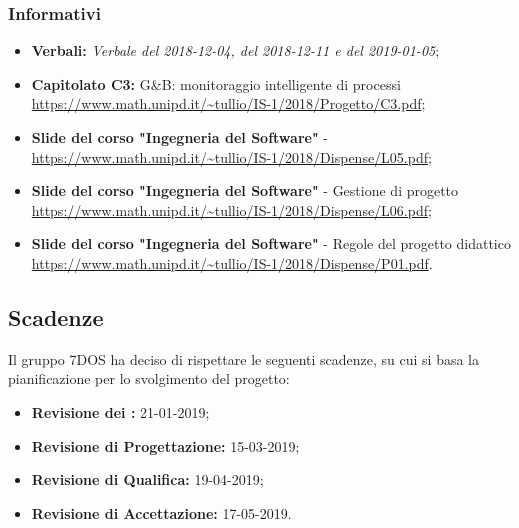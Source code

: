 \subsubsection{Informativi}
\begin{itemize}
	\item \textbf{Verbali:} \emph{Verbale del 2018-12-04, del 2018-12-11 e del 2019-01-05};
	\item \textbf{Capitolato C3:} G\&B: monitoraggio intelligente di processi 
 \\ \url{https://www.math.unipd.it/~tullio/IS-1/2018/Progetto/C3.pdf};
 	\item \textbf{Slide del corso "Ingegneria del Software"} - 
 \\ \url{https://www.math.unipd.it/~tullio/IS-1/2018/Dispense/L05.pdf};
	\item \textbf{Slide del corso "Ingegneria del Software"} - Gestione di progetto
 \\ \url{https://www.math.unipd.it/~tullio/IS-1/2018/Dispense/L06.pdf};
 	\item \textbf{Slide del corso "Ingegneria del Software"} - Regole del progetto didattico
 \\ \url{https://www.math.unipd.it/~tullio/IS-1/2018/Dispense/P01.pdf}.
 
\end{itemize}

\subsection{Scadenze}
Il gruppo 7DOS ha deciso di rispettare le seguenti scadenze, su cui si basa la pianificazione per lo svolgimento del progetto:
\begin{itemize}
	\item \textbf{Revisione dei :} 21-01-2019;
	\item \textbf{Revisione di Progettazione:} 15-03-2019;
	\item \textbf{Revisione di Qualifica:} 19-04-2019;
	\item \textbf{Revisione di Accettazione:} 17-05-2019.
\end{itemize}

\pagebreak
